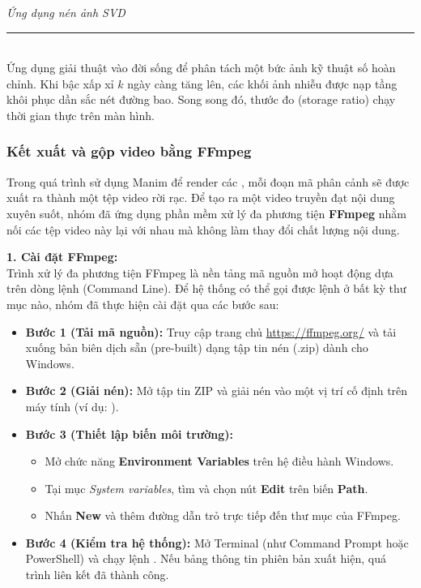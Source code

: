 \documentclass[a4paper]{article}
\begin{document}
\vspace{0.2cm}
\begin{mdframed}[linecolor=gray!50, linewidth=3pt, topline=false, bottomline=false, rightline=false, backgroundcolor=black!2, innerleftmargin=10pt, innertopmargin=8pt, innerbottommargin=8pt]
\textbf{\large {}} \hfill \textit{Ứng dụng nén ảnh SVD}\\
\vspace{-0.2cm}\rule{\linewidth}{0.5pt}\vspace{0.2cm}\\
Ứng dụng giải thuật vào đời sống để phân tách một bức ảnh kỹ thuật số hoàn chỉnh. Khi bậc xấp xỉ $k$ ngày càng tăng lên, các khối ảnh nhiễu được nạp tầng khôi phục dần sắc nét đường bao. Song song đó, thước đo (storage ratio) chạy thời gian thực trên màn hình.
\end{mdframed}

\subsubsection{Kết xuất và gộp video bằng FFmpeg}
Trong quá trình sử dụng Manim để render các , mỗi đoạn mã phân cảnh sẽ được xuất ra thành một tệp video  rời rạc. Để tạo ra một video truyền đạt nội dung xuyên suốt, nhóm đã ứng dụng phần mềm xử lý đa phương tiện \textbf{FFmpeg} nhằm nối các tệp video này lại với nhau mà không làm thay đổi chất lượng nội dung.

\textbf{1. Cài đặt FFmpeg:}\\
Trình xử lý đa phương tiện FFmpeg là nền tảng mã nguồn mở hoạt động dựa trên dòng lệnh (Command Line). Để hệ thống có thể gọi được lệnh  ở bất kỳ thư mục nào, nhóm đã thực hiện cài đặt qua các bước sau:

\begin{itemize}
    \setlength\itemsep{0.3em}
    \item \textbf{Bước 1 (Tải mã nguồn):} Truy cập trang chủ \url{https://ffmpeg.org/} và tải xuống bản biên dịch sẵn (pre-built) dạng tập tin nén (.zip) dành cho Windows.
    \item \textbf{Bước 2 (Giải nén):} Mở tập tin ZIP và giải nén vào một vị trí cố định trên máy tính (ví dụ: ).
    \item \textbf{Bước 3 (Thiết lập biến môi trường):} 
    \begin{itemize}
        \item Mở chức năng \textbf{Environment Variables} trên hệ điều hành Windows.
        \item Tại mục \textit{System variables}, tìm và chọn nút \textbf{Edit} trên biến \textbf{Path}.
        \item Nhấn \textbf{New} và thêm đường dẫn trỏ trực tiếp đến thư mục  của FFmpeg.
    \end{itemize}
    \item \textbf{Bước 4 (Kiểm tra hệ thống):} Mở Terminal (như Command Prompt hoặc PowerShell) và chạy lệnh . Nếu bảng thông tin phiên bản xuất hiện, quá trình liên kết đã thành công.
\end{itemize}
\end{document}
